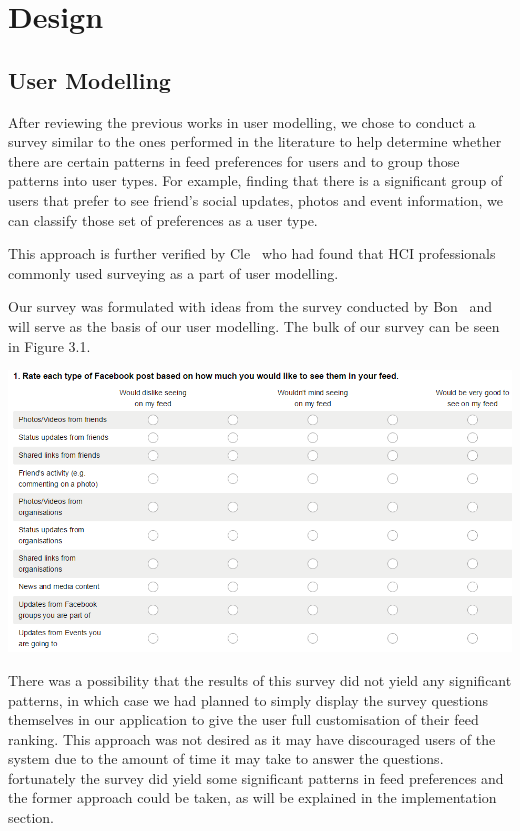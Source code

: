 
\chapter{Design}\label{ch:design}

\section{User Modelling}

After reviewing the previous works in user modelling, we chose to conduct a survey similar to the ones performed in the literature to help determine whether there are certain patterns in feed preferences for users and to group those patterns into user types. For example, finding that there is a significant group of users that prefer to see friend's social updates, photos and event information, we can classify those set of preferences as a user type. 

This approach is further verified by Cle~\cite{clemmensen2004four} who had found that HCI professionals commonly used surveying as a part of user modelling.

Our survey was formulated with ideas from the survey conducted by Bon~\cite{bonds2010myspace} and will serve as the basis of our user modelling. The bulk of our survey can be seen in Figure 3.1.

\begin{center}
\includegraphics[scale=0.7]{images/SurveyQuestion.png}
\end{center}

There was a possibility that the results of this survey did not yield any significant patterns, in which case we had planned to simply display the survey questions themselves in our application to give the user full customisation of their feed ranking. 
This approach was not desired as it may have discouraged users of the system due to the amount of time it may take to answer the questions. fortunately the survey did yield some significant patterns in feed preferences and the former approach could be taken, as will be explained in the implementation section.

